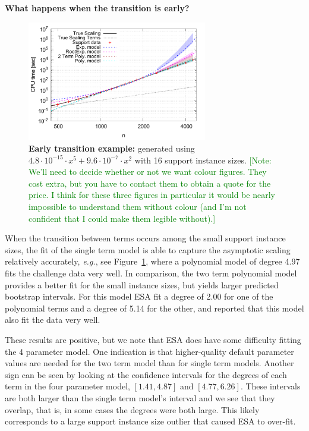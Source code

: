 \documentclass[aic]{iosart2x}
\newcommand{\eg}{\emph{e.g.}}
\newcommand{\note}[1]{\textcolor{green}{[Note: #1]}}
\begin{document}
\textbf{What happens when the transition is early?}
\begin{figure}[t]
\centering
\includegraphics[width=0.7\textwidth]{fittedModels-2-5-14-16s.pdf}
\caption{\textbf{Early transition example:} generated using $4.8\cdot 10^{-15} \cdot x^5 + 9.6\cdot 10^{-7} \cdot x^2$ with 16 support instance sizes. \note{We'll need to decide whether or not we want colour figures. They cost extra, but you have to contact them to obtain a quote for the price. I think for these three figures in particular it would be nearly impossible to understand them without colour (and I'm not confident that I could make them legible without).}}
\label{fig:AA-competing-2-5-14-16s}
\end{figure}
When the transition between terms occurs among the small support instance sizes, the fit of the single term model is able to capture the asymptotic scaling relatively accurately, \eg{}, see Figure~\ref{fig:AA-competing-2-5-14-16s}, where a polynomial model of degree 4.97 fits the challenge data very well. In comparison, the two term polynomial model provides a better fit for the small instance sizes, but yields larger predicted bootstrap intervals. For this model ESA fit a degree of 2.00 for one of the polynomial terms and a degree of 5.14 for the other, and reported that this model also fit the data very well. 

These results are positive, but we note that ESA does have some difficulty fitting the 4 parameter model. One indication is that higher-quality default parameter values are needed for the two term model than for single term models. Another sign can be seen by looking at the confidence intervals for the degrees of each term in the four parameter model, $[1.41,4.87]$ and $[4.77,6.26]$. These intervals are both larger than the single term model's interval and we see that they overlap, that is, in some cases the degrees were both large. This likely corresponds to a large support instance size outlier that caused ESA to over-fit. 
\end{document}
